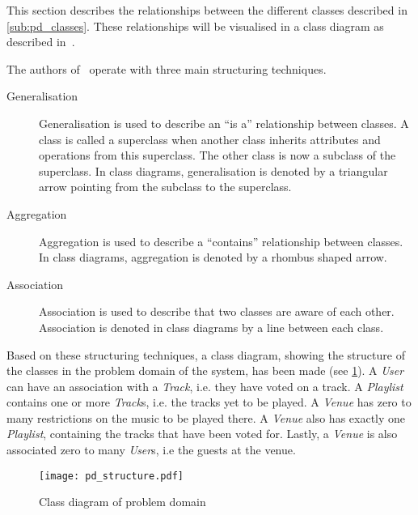 This section describes the relationships between the different classes
described in \cref{sub:pd_classes}. These relationships will be
visualised in a class diagram as described
in~\cite{mathiassen2001objektorienteret}.

The authors of~\cite{mathiassen2001objektorienteret} operate with three
main structuring techniques.

\begin{description}
\item[Generalisation] Generalisation is used to describe an \enquote{is a}
  relationship between classes. A class is called a
  superclass when another class inherits attributes and operations
  from this superclass. The other class is now a subclass of the
  superclass. In class diagrams, generalisation is denoted by a
  triangular arrow pointing from the subclass to the superclass.
\item[Aggregation] Aggregation is used to describe a
  \enquote{contains} relationship between classes. In class diagrams,
  aggregation is denoted by a rhombus shaped arrow.
\item[Association] Association is used to describe that two classes
  are aware of each other. Association is denoted in class diagrams by
  a line between each class.
\end{description} 

Based on these structuring techniques, a class diagram, showing the structure of the classes in the problem domain of the system, has been made (see \cref{fig:pd_structure}). A \textit{User} can have an association with a \textit{Track}, i.e. they have voted on a track. A \textit{Playlist} contains one or more \textit{Track}s, i.e. the tracks yet to be played. A \textit{Venue} has zero to many restrictions on the music to be played there. A \textit{Venue} also has exactly one \textit{Playlist}, containing the tracks that have been voted for. Lastly, a \textit{Venue} is also associated zero to many \textit{User}s, i.e the guests at the venue.

\begin{figure}
  \centering
  \texttt{[image: pd\_structure.pdf]}
  \caption{Class diagram of problem domain}\label{fig:pd_structure}
\end{figure}
